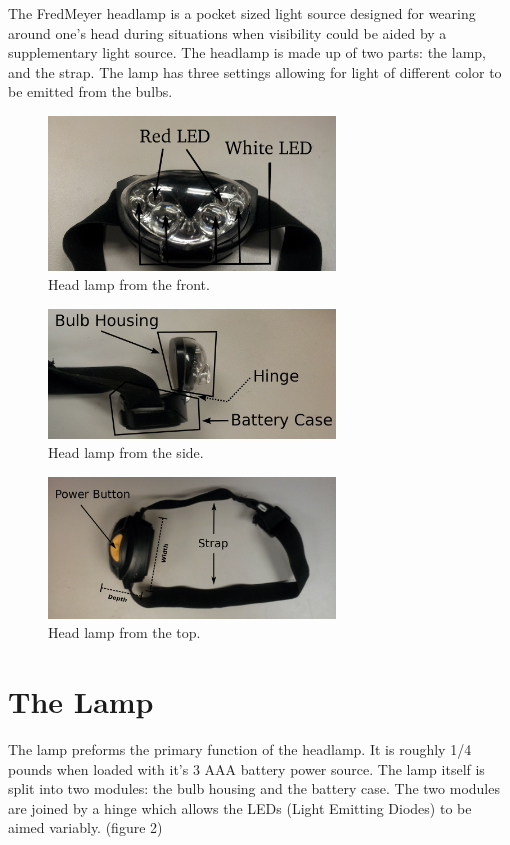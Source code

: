 \documentclass[12pt]{article}
\begin{document}
The FredMeyer headlamp is a pocket sized light source designed for wearing around one's head during
situations when visibility could be aided by a supplementary light source. The headlamp is made up
of two parts: the lamp, and the strap. The lamp has three settings allowing for light of different
color to be emitted from the bulbs.

\begin{figure}[h!]
\centering
\caption{Head lamp from the front.}
\includegraphics[width=3in]{headlamp}
\end{figure}

\begin{figure}[h!]
\centering
\caption{Head lamp from the side.}
\includegraphics[width=3in]{headlamp_side}
\end{figure}

\begin{figure}[h!]
\centering
\caption{Head lamp from the top.}
\includegraphics[width=3in]{headlamp_top}
\end{figure}

\section{The Lamp}
The lamp preforms the primary function of the headlamp. It is roughly 1/4 pounds when loaded with
it's 3 AAA battery power source. The lamp itself is split into two modules: the bulb housing and the
battery case. The two modules are joined by a hinge which allows the LEDs (Light Emitting
Diodes) to be aimed variably. (figure 2)
\end{document}
